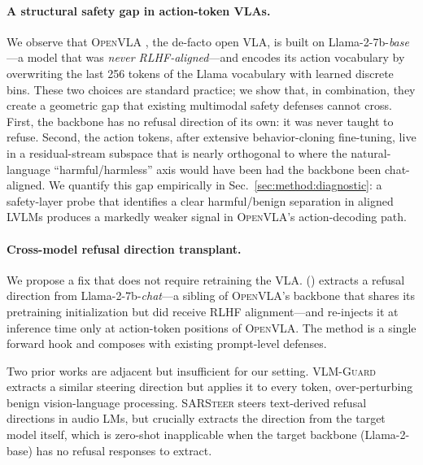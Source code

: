 \paragraph{A structural safety gap in action-token VLAs.}
We observe that \textsc{OpenVLA} \citep{openvla2024}, the de-facto open VLA, is built on Llama-2-7b-\emph{base}---a model that was \emph{never RLHF-aligned}---and encodes its action vocabulary by overwriting the last 256 tokens of the Llama vocabulary with learned discrete bins. These two choices are standard practice; we show that, in combination, they create a geometric gap that existing multimodal safety defenses cannot cross. First, the backbone has no refusal direction of its own: it was never taught to refuse. Second, the action tokens, after extensive behavior-cloning fine-tuning, live in a residual-stream subspace that is nearly orthogonal to where the natural-language ``harmful/harmless'' axis would have been had the backbone been chat-aligned. We quantify this gap empirically in Sec.~\ref{sec:method:diagnostic}: a safety-layer probe that identifies a clear harmful/benign separation in aligned LVLMs \citep{securitytensors2025} produces a markedly weaker signal in \textsc{OpenVLA}'s action-decoding path.

\paragraph{Cross-model refusal direction transplant.}
We propose a fix that does not require retraining the VLA. \methodfull{} (\method{}) extracts a refusal direction from Llama-2-7b-\emph{chat}---a sibling of \textsc{OpenVLA}'s backbone that shares its pretraining initialization but did receive RLHF alignment---and re-injects it at inference time only at action-token positions of \textsc{OpenVLA}. The method is a single forward hook and composes with existing prompt-level defenses.

Two prior works are adjacent but insufficient for our setting. \textsc{VLM-Guard} \citep{vlmguard2025} extracts a similar steering direction but applies it to every token, over-perturbing benign vision-language processing. \textsc{SARSteer} \citep{sarsteer2025} steers text-derived refusal directions in audio LMs, but crucially extracts the direction from the target model itself, which is zero-shot inapplicable when the target backbone (Llama-2-base) has no refusal responses to extract.

